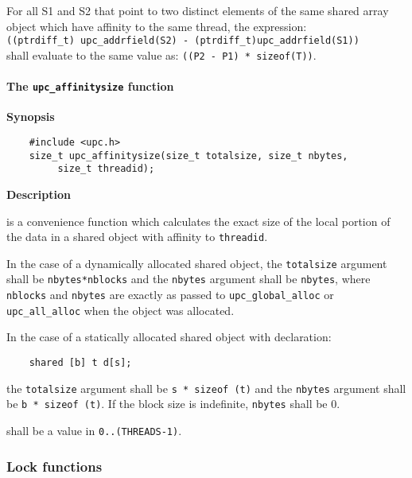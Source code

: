    For all S1 and S2 that point to two distinct elements of
   the same shared array object which have affinity to the same
   thread, the expression:\\
    {\tt ((ptrdiff\_t) upc\_addrfield(S2) - (ptrdiff\_t)upc\_addrfield(S1))} \\
   shall evaluate to the same value as: {\tt ((P2 - P1) * sizeof(T))}.


\paragraph{The {\tt upc\_affinitysize} function}

{\bf Synopsis} 

\npf\vspace{-2.5em}
\begin{verbatim}
    #include <upc.h> 
    size_t upc_affinitysize(size_t totalsize, size_t nbytes, 
         size_t threadid);
\end{verbatim}

{\bf Description}

 is a convenience function which 
    calculates the exact size of the local portion of the data in a 
    shared object with affinity to {\tt threadid}.
    
\np In the case of a dynamically allocated shared object,
    the {\tt totalsize} argument shall be {\tt nbytes*nblocks} and the {\tt nbytes}
    argument shall be {\tt nbytes}, where {\tt nblocks} and {\tt nbytes} are exactly as
    passed to {\tt upc\_global\_alloc} or {\tt upc\_all\_alloc} when the 
    object was allocated.

\np In the case of a statically allocated shared object
    with declaration:

\begin{verbatim}
    shared [b] t d[s];
\end{verbatim}   

    the {\tt totalsize} argument shall be {\tt s * sizeof (t)} and the
    {\tt nbytes} argument shall be {\tt b * sizeof (t)}.  If the block
    size is indefinite, {\tt nbytes} shall be 0.
        
 shall be a value in {\tt 0..(THREADS-1)}.

\subsubsection{Lock functions}
\label{upc_lock}

